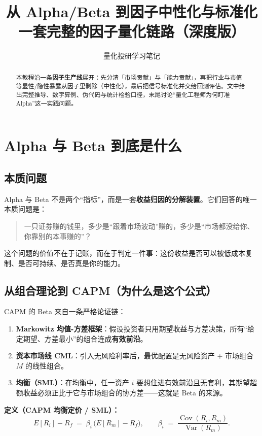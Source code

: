 \documentclass[UTF8,11pt]{ctexart}
\title{\bfseries 从 Alpha/Beta 到因子中性化与标准化\\[2pt]\large 一套完整的因子量化链路（深度版）}
\author{量化投研学习笔记}
\date{}
\begin{document}
\maketitle

\begin{abstract}
本教程沿一条\textbf{因子生产线}展开：先分清「市场贡献」与「能力贡献」，再把行业与市值等显性/隐性暴露从因子里剥除（中性化），最后把信号标准化并交给回测评估。文中给出完整推导、数字算例、伪代码与统计检验口径，末尾讨论“量化工程师为何盯准 Alpha”这一实践问题。
\end{abstract}

\tableofcontents
\newpage

\section{Alpha 与 Beta 到底是什么}

\subsection{本质问题}
Alpha 与 Beta 不是两个“指标”，而是一套\textbf{收益归因的分解装置}。它们回答的唯一本质问题是：
\begin{quote}
一只证券赚的钱里，多少是“跟着市场波动”赚的，多少是“市场都没给你、你靠别的本事赚的”？
\end{quote}
这个问题的价值不在于记账，而在于判定一件事：这份收益是否可以被低成本复制、是否可持续、是否真是你的能力。

\subsection{从组合理论到 CAPM（为什么是这个公式）}
CAPM 的 Beta 来自一条严格论证链：
\begin{enumerate}[itemsep=2pt]
\item \textbf{Markowitz 均值-方差框架}：假设投资者只用期望收益与方差决策，所有“给定期望、方差最小”的组合连成\textbf{有效前沿}。
\item \textbf{资本市场线 CML}：引入无风险利率后，最优配置是无风险资产 $+$ 市场组合 $M$ 的线性组合。
\item \textbf{均衡（SML）}：在均衡中，任一资产 $i$ 要想住进有效前沿且无套利，其期望超额收益必须正比于它与市场组合的协方差——这就是 Beta 的来源。
\end{enumerate}

\textbf{定义（CAPM 均衡定价 / SML）：}
\begin{equation}
E[R_i]-R_f \;=\; \beta_i\,\big(E[R_m]-R_f\big),
\qquad
\beta_i \;=\; \frac{\operatorname{Cov}(R_i,R_m)}{\operatorname{Var}(R_m)}.
\end{equation}
\end{document}
